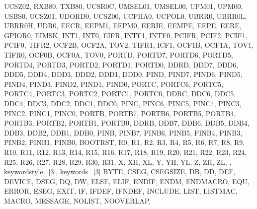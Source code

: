 {{                UCSZ02, RXB80, TXB80,
                UCSR0C, UMSEL01, UMSEL00, UPM01, UPM00, USBS0, 
                UCSZ01, UDORD0, UCSZ00, UCPHA0, UCPOL0,
                UBRR0, UBRR0L, UBRR0H,
                UDR0,
                EECR, EEPM1, EEPM0, EERIE, EEMPE, EEPE, EERE,
                GPIOR0,
                EIMSK, INT1, INT0,
                EIFR, INTF1, INTF0,
                PCIFR, PCIF2, PCIF1, PCIF0,
                TIFR2, OCF2B, OCF2A, TOV2, 
                TIFR1, ICF1, OCF1B, OCF1A, TOV1, 
                TIFR0, OCF0B, OCF0A, TOV0, 
                PORTD, PORTD7, PORTD6, PORTD5, PORTD4, PORTD3, 
                PORTD2, PORTD1, PORTD0, 
                DDRD, DDD7, DDD6, DDD5, DDD4, DDD3, DDD2, DDD1, 
                DDD0, 
                PIND, PIND7, PIND6, PIND5, PIND4, PIND3, PIND2, 
                PIND1, PIND0, 
                PORTC, PORTC6, PORTC5, PORTC4, PORTC3, PORTC2, 
                PORTC1, PORTC0, 
                DDRC, DDC6, DDC5, DDC4, DDC3, DDC2, DDC1, DDC0, 
                PINC, PINC6, PINC5, PINC4, PINC3, PINC2, PINC1, 
                PINC0, 
                PORTB, PORTB7, PORTB6, PORTB5, PORTB4, PORTB3, 
                PORTB2, PORTB1, PORTB0, 
                DDRB, DDB7, DDB6, DDB5, DDB4, DDB3, DDB2, DDB1, 
                DDB0, 
                PINB, PINB7, PINB6, PINB5, PINB4, PINB3, PINB2, 
                PINB1, PINB0, 
                BOOTRST,
                R0,  R1,  R2,  R3,  R4,  R5,  R6,  R7,  R8, 
                R9,  R10, R11, R12, R13, R14, R15, R16, R17, 
                R18, R19, R20, R21, R22, R23, R24, R25, R26, 
                R27, R28, R29, R30, R31, 
                X, XH, XL,
                Y, YH, YL,
                Z, ZH, ZL,
                },  
% 
%
  keywordstyle=[3]\color{arduinoOrange},
  keywords=[3]{  %
                BYTE,
                CSEG, CSEGSIZE,
                DB, DD, DEF, DEVICE, DSEG, DQ, DW,
                ELSE, ELIF, ENDIF, ENDM, ENDMACRO, EQU, 
                ERROR, ESEG, EXIT,
                IF, IFDEF, IFNDEF, INCLUDE,
                LIST, LISTMAC,
                MACRO, MESSAGE,
                NOLIST, NOOVERLAP,
}}
